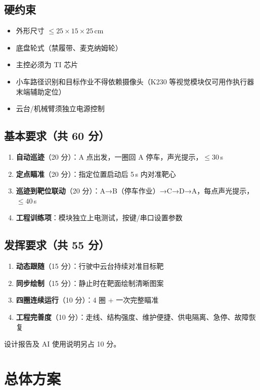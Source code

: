 \documentclass[12pt,a4paper]{ctexart}
\begin{document}
\subsection{硬约束}
\begin{itemize}[nosep]
    \item 外形尺寸 $\leq 25\times15\times25$\,cm
    \item 底盘轮式（禁履带、麦克纳姆轮）
    \item 主控必须为 TI 芯片
    \item 小车路径识别和目标作业不得依赖摄像头（K230 等视觉模块仅可用作执行器末端辅助定位）
    \item 云台/机械臂须独立电源控制
\end{itemize}

\subsection{基本要求（共 60 分）}
\begin{enumerate}[nosep]
    \item \textbf{自动巡迹}（20 分）：A 点出发，一圈回 A 停车，声光提示，$\leq 30$\,s
    \item \textbf{定点瞄准}（20 分）：指定位置启动后 5\,s 内对准靶心
    \item \textbf{巡迹到靶位联动}（20 分）：A→B（停车作业）→C→D→A，每点声光提示，$\leq 40$\,s
    \item \textbf{工程训练项}：模块独立上电测试，按键/串口设置参数
\end{enumerate}

\subsection{发挥要求（共 55 分）}
\begin{enumerate}[nosep]
    \item \textbf{动态跟随}（15 分）：行驶中云台持续对准目标靶
    \item \textbf{同步绘制}（15 分）：静止时在靶面绘制清晰图案
    \item \textbf{四圈连续运行}（10 分）：4 圈 + 一次完整瞄准
    \item \textbf{工程完善度}（10 分）：走线、结构强度、维护便捷、供电隔离、急停、故障恢复
\end{enumerate}
设计报告及 AI 使用说明另占 10 分。

\section{总体方案}
\end{document}
